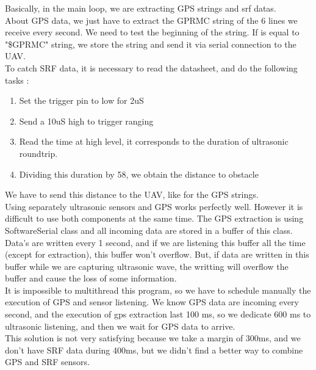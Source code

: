 Basically, in the main loop, we are extracting GPS strings and srf datas.\\

About GPS data, we just have to extract the GPRMC string of the 6 lines we receive every second.
We need to test the beginning of the string. If is equal to "\$GPRMC" string, we store the string and send it via 
serial connection to the UAV.\\

To catch SRF data, it is necessary to read the datasheet, and do the following tasks :\\

\begin{enumerate}
\item Set the trigger pin to low for 2uS
\item Send a 10uS high to trigger ranging
\item Read the time at high level, it corresponds to the duration of ultrasonic roundtrip.
\item Dividing this duration by 58, we obtain the distance to obstacle
\end{enumerate}

We have to send this distance to the UAV, like for the GPS strings.\\

Using separately ultrasonic sensors and GPS works perfectly well. However it is difficult to use both components at the same time. The GPS extraction is using SoftwareSerial class and all incoming data are stored in a buffer of this class. Data's are written every 1 second, and if we are listening this buffer all the time (except for extraction), this buffer won't overflow. But, if data are written in this buffer while we are capturing ultrasonic wave, the writting will overflow the buffer and cause the loss of some information.\\

It is impossible to multithread this program, so we have to schedule manually the execution of GPS and sensor listening. We know GPS data are incoming every second, and the execution of gps extraction last 100 ms, so we dedicate 600 ms to ultrasonic listening, and then we wait for GPS data to arrive.\\

This solution is not very satisfying because we take a margin of 300ms, and we don't have SRF data during 400ms, but we didn't find a better way to combine GPS and SRF sensors.\\

